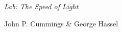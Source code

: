 {\LARGE {\em \noindent Lab: The Speed of Light}}

\large{\noindent John P. Cummings \& George Hassel}


